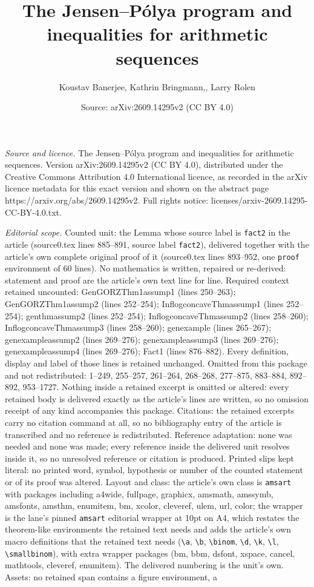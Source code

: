 \documentclass[10pt,a4paper]{amsart}
\title[The Jensen--P\'{o}lya program and inequalities for arithmeti]{The Jensen--P\'{o}lya program and inequalities for arithmetic sequences}
\author{Koustav Banerjee, Kathrin Bringmann,, Larry Rolen}
\date{Source: arXiv:2609.14295v2 (CC BY 4.0)}
\begin{document}
\maketitle

\noindent\emph{Source and licence.} The Jensen--P\'{o}lya program and inequalities for arithmetic sequences. Version arXiv:2609.14295v2 (CC BY 4.0), distributed under the Creative Commons Attribution 4.0 International licence, as recorded in the arXiv licence metadata for this exact version and shown on the abstract page https://arxiv.org/abs/2609.14295v2. Full rights notice: licenses/arxiv-2609.14295-CC-BY-4.0.txt.\par\smallskip

\noindent\textit{Editorial scope.} Counted unit: the Lemma whose source label is \texttt{fact2} in the article (source0.tex lines 885--891, source label \texttt{fact2}), delivered together with the article's own complete original proof of it (source0.tex lines 893--952, one \texttt{proof} environment of 60 lines). No mathematics is written, repaired or re-derived: statement and proof are the article's own text line for line. Required context retained uncounted: GenGORZThm1assump1 (lines 250--263); GenGORZThm1assump2 (lines 252--254); InflogconcaveThmassump1 (lines 252--254); genthmassump2 (lines 252--254); InflogconcaveThmassump2 (lines 258--260); InflogconcaveThmassump3 (lines 258--260); genexample (lines 265--267); genexampleassump2 (lines 269--276); genexampleassump3 (lines 269--276); genexampleassump4 (lines 269--276); Fact1 (lines 876--882). Every definition, display and label of those lines is retained unchanged. Omitted from this package and not redistributed: 1--249, 255--257, 261--264, 268--268, 277--875, 883--884, 892--892, 953--1727. Nothing inside a retained excerpt is omitted or altered: every retained body is delivered exactly as the article's lines are written, so no omission receipt of any kind accompanies this package. Citations: the retained excerpts carry no citation command at all, so no bibliography entry of the article is transcribed and no reference is redistributed. Reference adaptation: none was needed and none was made; every reference inside the delivered unit resolves inside it, so no unresolved reference or citation is produced. Printed slips kept literal: no printed word, symbol, hypothesis or number of the counted statement or of its proof was altered. Layout and class: the article's own class is \texttt{amsart} with packages including a4wide, fullpage, graphicx, amsmath, amssymb, amsfonts, amsthm, enumitem, bm, xcolor, cleveref, ulem, url, color; the wrapper is the lane's pinned \texttt{amsart} editorial wrapper at 10pt on A4, which restates the theorem-like environments the retained text needs and adds the article's own macro definitions that the retained text needs (\texttt{\textbackslash a}, \texttt{\textbackslash b}, \texttt{\textbackslash binom}, \texttt{\textbackslash d}, \texttt{\textbackslash k}, \texttt{\textbackslash l}, \texttt{\textbackslash smallbinom}), with extra wrapper packages (bm, bbm, dsfont, xspace, cancel, mathtools, cleveref, enumitem). The delivered numbering is the unit's own. Assets: no retained span contains a figure environment, a 
\end{document}

